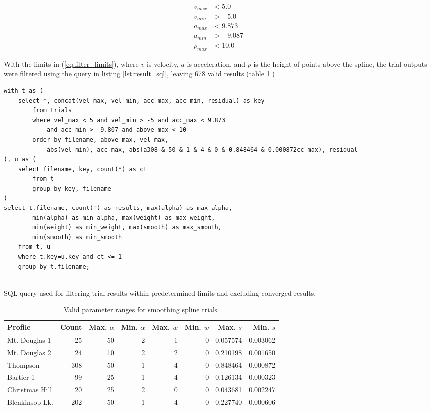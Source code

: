 \documentclass[doc]{apa6}
\begin{document}
\begin{equation} \label{eq:filter_limits}
\begin{split}
v_{max} &< 5.0 \\
v_{min} &> -5.0 \\
a_{max} &< 9.873 \\
a_{min} &> -9.087 \\
p_{max} &< 10.0
\end{split}
\end{equation}

With the limits in (\ref{eq:filter_limits}), where $v$ is velocity, $a$ is acceleration, and $p$ is the height of points above the spline, the trial outputs were filtered using the query in listing \ref{lst:result_sql}, leaving 678 valid results (table \ref{table:arg_results}.)

\begin{listing}
\begin{verbatim}
with t as (
	select *, concat(vel_max, vel_min, acc_max, acc_min, residual) as key 
		from trials 
		where vel_max < 5 and vel_min > -5 and acc_max < 9.873 
			and acc_min > -9.807 and above_max < 10 
		order by filename, above_max, vel_max, 
			abs(vel_min), acc_max, abs(a308 & 50 & 1 & 4 & 0 & 0.848464 & 0.000872cc_max), residual
), u as (
	select filename, key, count(*) as ct 
		from t 
		group by key, filename
)
select t.filename, count(*) as results, max(alpha) as max_alpha, 
		min(alpha) as min_alpha, max(weight) as max_weight, 
		min(weight) as min_weight, max(smooth) as max_smooth, 
		min(smooth) as min_smooth 
	from t, u 
	where t.key=u.key and ct <= 1 
	group by t.filename;


\end{verbatim}
\caption{SQL query used for filtering trial results within predetermined limits and excluding converged results.}
\label{lst:result_sql}
\end{listing}



\begin{table}
\caption{Valid parameter ranges for smoothing spline trials.}
\label{table:arg_results}
\begin{tabular}{l | r || r | r | r | r | r | r} 
Profile & Count & Max. $\alpha$ & Min. $\alpha$ & Max. $w$ & Min. $w$ & Max. $s$ & Min. $s$ \\
\hline
Mt. Douglas 1  & 25  & 50 & 2 & 1 & 0 & 0.057574 & 0.003062 \\
Mt. Douglas 2  & 24  & 10 & 2 & 2 & 0 & 0.210198 & 0.001650 \\
Thompson       & 308 & 50 & 1 & 4 & 0 & 0.848464 & 0.000872 \\
Bartier 1      & 99  & 25 & 1 & 4 & 0 & 0.126134 & 0.000323 \\
Christmas Hill & 20  & 25 & 2 & 0 & 0 & 0.043681 & 0.002247 \\
Blenkinsop Lk. & 202 & 50 & 1 & 4 & 0 & 0.227740 & 0.000606\\
\end{tabular}
\end{table}
\end{document}

